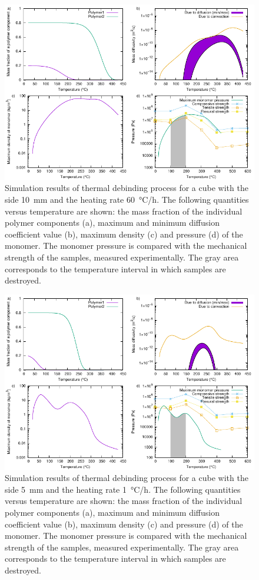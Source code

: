 \documentclass{article}
\newcommand{\ResultsCaption}[2]{
    Simulation results of thermal debinding process for a cube
    with the side \SI{#1}{\mm} and the heating rate \SI{#2}{\celsius/\hour}.
    The following quantities versus temperature are shown:
    the mass fraction of the individual polymer components (a),
    maximum and minimum diffusion coefficient value (b),
    maximum density (c) and pressure (d) of the monomer.
    The monomer pressure is compared with the mechanical strength of the samples,
    measured experimentally.
    The gray area corresponds to the temperature interval in which samples are destroyed.
}
\begin{document}
\begin{figure}
    \centering
    \includegraphics[width=\textwidth]{debinding_all_10mm_60KperHour}
    \caption{\ResultsCaption{10}{60}}
    \label{fig:debinding_all_10mm_60KperHour}
\end{figure}

\begin{figure}
    \centering
    \includegraphics[width=\textwidth]{debinding_all_5mm_1KperHour}
    \caption{\ResultsCaption{5}{1}}
    \label{fig:debinding_all_5mm_1KperHour}
\end{figure}
\end{document}
